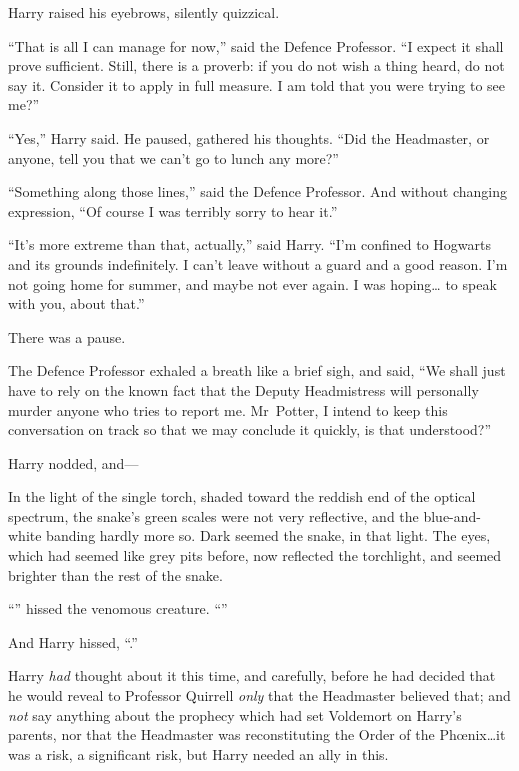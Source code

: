 Harry raised his eyebrows, silently quizzical.

“That is all I can manage for now,” said the Defence Professor. “I expect it shall prove sufficient. Still, there is a proverb: if you do not wish a thing heard, do not say it. Consider it to apply in full measure. I am told that you were trying to see me?”

“Yes,” Harry said. He paused, gathered his thoughts. “Did the Headmaster, or anyone, tell you that we can’t go to lunch any more?”

“Something along those lines,” said the Defence Professor. And without changing expression, “Of course I was terribly sorry to hear it.”

“It’s more extreme than that, actually,” said Harry. “I’m confined to Hogwarts and its grounds indefinitely. I can’t leave without a guard and a good reason. I’m not going home for summer, and maybe not ever again. I was hoping… to speak with you, about that.”

There was a pause.

The Defence Professor exhaled a breath like a brief sigh, and said, “We shall just have to rely on the known fact that the Deputy Headmistress will personally murder anyone who tries to report me. Mr~Potter, I intend to keep this conversation on track so that we may conclude it quickly, is that understood?”

Harry nodded, and—

In the light of the single torch, shaded toward the reddish end of the optical spectrum, the snake’s green scales were not very reflective, and the blue-and-white banding hardly more so. Dark seemed the snake, in that light. The eyes, which had seemed like grey pits before, now reflected the torchlight, and seemed brighter than the rest of the snake.

“” hissed the venomous creature. “”

And Harry hissed, “.”

Harry \emph{had} thought about it this time, and carefully, before he had decided that he would reveal to Professor Quirrell \emph{only} that the Headmaster believed that; and \emph{not} say anything about the prophecy which had set Voldemort on Harry’s parents, nor that the Headmaster was reconstituting the Order of the Phœnix…it was a risk, a significant risk, but Harry needed an ally in this.

